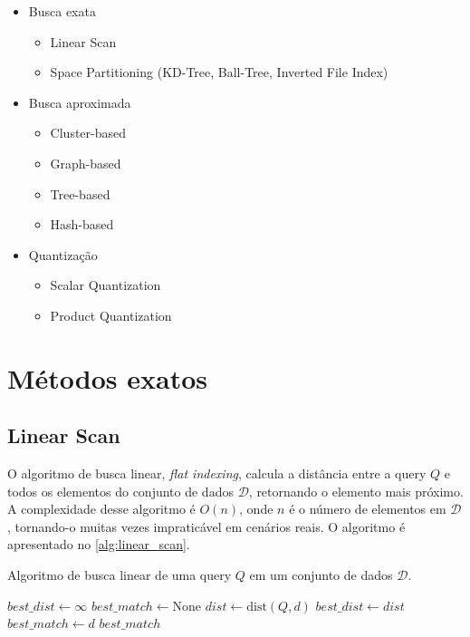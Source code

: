 \begin{itemize}
    \item Busca exata
    \begin{itemize}
        \item Linear Scan
        \item Space Partitioning (KD-Tree, Ball-Tree, Inverted File Index)
    \end{itemize}
    \item Busca aproximada
    \begin{itemize}
        \item Cluster-based
        \item Graph-based
        \item Tree-based
        \item Hash-based 
    \end{itemize}
    \item Quantização
    \begin{itemize}
        \item Scalar Quantization
        \item Product Quantization
    \end{itemize}
\end{itemize}

\section{Métodos exatos}

\subsection{Linear Scan}

O algoritmo de busca linear, \textit{flat indexing}, calcula a distância entre a query $Q$ e todos os elementos do conjunto de dados $\mathcal{D}$, retornando o elemento mais próximo. A complexidade desse algoritmo é $O(n)$, onde $n$ é o número de elementos em $\mathcal{D}$, tornando-o muitas vezes impraticável em cenários reais. O algoritmo é apresentado no \cref{alg:linear_scan}.

\begin{algorithm}
\caption{Algoritmo de busca linear de uma query $Q$ em um conjunto de dados $\mathcal{D}$.}
\label{alg:linear_scan}
\begin{algorithmic}[1]
    \State $best\_dist \gets \infty$
    \State $best\_match \gets \text{None}$
        \State $dist \gets \text{dist}(Q, d)$
            \State $best\_dist \gets dist$
            \State $best\_match \gets d$
        \EndIf
    \EndFor
    \State \Return $best\_match$
\EndProcedure
\end{algorithmic}
\end{algorithm}

